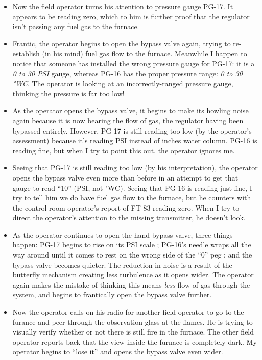 \begin{itemize}
\vskip 10pt
\item{} Now the field operator turns his attention to pressure gauge PG-17.  It appears to be reading zero, which to him is further proof that the regulator isn't passing any fuel gas to the furnace.
\vskip 10pt
\item{} Frantic, the operator begins to open the bypass valve again, trying to re-establish (in his mind) fuel gas flow to the furnace.  Meanwhile I happen to notice that someone has installed the wrong pressure gauge for PG-17: it is a {\it 0 to 30 PSI} gauge, whereas PG-16 has the proper pressure range: {\it 0 to 30 "WC}.  The operator is looking at an incorrectly-ranged pressure gauge, thinking the pressure is far too low!
\vskip 10pt
\item{} As the operator opens the bypass valve, it begins to make its howling noise again because it is now bearing the flow of gas, the regulator having been bypassed entirely.  However, PG-17 is still reading too low (by the operator's assessment) because it's reading PSI instead of inches water column.  PG-16 is reading fine, but when I try to point this out, the operator ignores me.  
\vskip 10pt
\item{} Seeing that PG-17 is still reading too low (by his interpretation), the operator opens the bypass valve even more than before in an attempt to get that gauge to read ``10'' (PSI, not "WC).  Seeing that PG-16 is reading just fine, I try to tell him we do have fuel gas flow to the furnace, but he counters with the control room operator's report of FT-83 reading zero.  When I try to direct the operator's attention to the missing transmitter, he doesn't look.
\vskip 10pt
\item{} As the operator continues to open the hand bypass valve, three things happen: PG-17 begins to rise on its PSI scale ; PG-16's needle wraps all the way around until it comes to rest on the wrong side of the ``0'' peg ; and the bypass valve becomes quieter.  The reduction in noise is a result of the butterfly mechanism creating less turbulence as it opens wider.  The operator again makes the mistake of thinking this means {\it less} flow of gas through the system, and begins to frantically open the bypass valve further.
\vskip 10pt
\item{} Now the operator calls on his radio for another field operator to go to the furance and peer through the observation glass at the flames.  He is trying to visually verify whether or not there is still fire in the furnace.  The other field operator reports back that the view inside the furnace is completely dark.  My operator begins to ``lose it'' and opens the bypass valve even wider.

\end{itemize}
